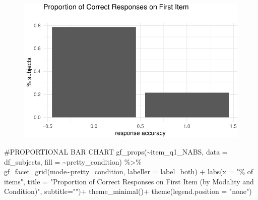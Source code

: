 \documentclass[
  letterpaper,
  DIV=11,
  numbers=noendperiod]{scrreprt}
\newenvironment{Shaded}{\begin{snugshade}}{\end{snugshade}}
\newcommand{\AttributeTok}[1]{\textcolor[rgb]{0.40,0.45,0.13}{#1}}
\newcommand{\CommentTok}[1]{\textcolor[rgb]{0.37,0.37,0.37}{#1}}
\newcommand{\FunctionTok}[1]{\textcolor[rgb]{0.28,0.35,0.67}{#1}}
\newcommand{\NormalTok}[1]{\textcolor[rgb]{0.00,0.23,0.31}{#1}}
\newcommand{\SpecialCharTok}[1]{\textcolor[rgb]{0.37,0.37,0.37}{#1}}
\newcommand{\StringTok}[1]{\textcolor[rgb]{0.13,0.47,0.30}{#1}}
\begin{document}
\begin{figure}[H]

{\centering \includegraphics{analysis/SGC3A/3_sgc3A_description_files/figure-pdf/VIS-FIRST-ABSOLUTE-1.pdf}

}

\end{figure}

\begin{Shaded}
\begin{Highlighting}[]
\CommentTok{\#PROPORTIONAL BAR CHART}
\FunctionTok{gf\_props}\NormalTok{(}\SpecialCharTok{\textasciitilde{}}\NormalTok{item\_q1\_NABS, }\AttributeTok{data =}\NormalTok{ df\_subjects, }\AttributeTok{fill =} \SpecialCharTok{\textasciitilde{}}\NormalTok{pretty\_condition) }\SpecialCharTok{\%\textgreater{}\%} 
  \FunctionTok{gf\_facet\_grid}\NormalTok{(mode}\SpecialCharTok{\textasciitilde{}}\NormalTok{pretty\_condition, }\AttributeTok{labeller =}\NormalTok{ label\_both) }\SpecialCharTok{+}
  \FunctionTok{labs}\NormalTok{(}\AttributeTok{x =} \StringTok{"\% of items"}\NormalTok{,}
       \AttributeTok{title =} \StringTok{"Proportion of Correct Responses on First Item (by Modality and Condition)"}\NormalTok{,}
       \AttributeTok{subtitle=}\StringTok{""}\NormalTok{)}\SpecialCharTok{+}
  \FunctionTok{theme\_minimal}\NormalTok{()}\SpecialCharTok{+} \FunctionTok{theme}\NormalTok{(}\AttributeTok{legend.position =} \StringTok{"none"}\NormalTok{)}
\end{Highlighting}
\end{Shaded}
\end{document}
